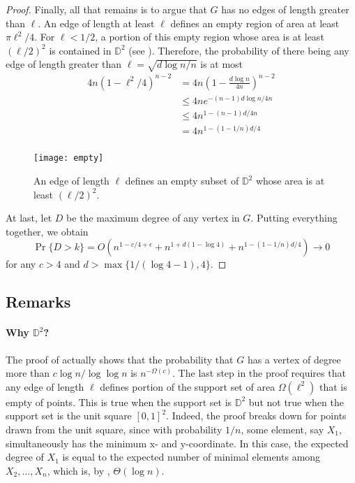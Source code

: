 \documentclass[lotsofwhite,charterfonts]{patmorin}
\newcommand{\D}{\mathbb{D}}
\begin{document}
\begin{proof}
Finally, all that remains is to argue that $G$ has no edges of length
greater than $\ell$.  An edge of length at least $\ell$ defines an empty
region of area at least $\pi\ell^2/4$.  For $\ell < 1/2$, a portion of
this empty region whose area is at least $(\ell/2)^2$ is contained in
$\D^2$ (see ).  Therefore, the probability of there being
any edge of length greater than $\ell=\sqrt{d\log n/n}$ is at most
\[
 \begin{aligned}
   4n(1-\ell^2/4)^{n-2} 
    &  =  4n\left(1-\frac{d\log n}{4n}\right)^{n-2} \\
    & \le 4ne^{-(n-1)d\log n/4n} \\
    & \le 4n^{1-(n-1)d/4n} \\
    & = 4n^{1-(1-1/n)d/4} \\
 \end{aligned}
\]

\begin{figure}
  \begin{center}
    \texttt{[image: empty]}
  \end{center}
  \caption{An edge of length $\ell$ defines an empty subset of $\D^2$ whose
  area is at least $(\ell/2)^2$.}
\end{figure}

At last, let $D$ be the maximum degree of any vertex in $G$.  Putting
everything together, we obtain
\[
   \Pr\{D > k\} = O(n^{1-c/4+\epsilon} 
                      + n^{1+d(1-\log 4)}
                      + n^{1-(1-1/n)d/4} )  \rightarrow 0
\]
for any
$c > 4$ and $d>\max\{1/(\log 4-1),4\}$.
\end{proof}

\subsection{Remarks}

\paragraph{Why $\D^2$?} 
The proof of  actually shows that the
probability that $G$ has a vertex of degree more than $c\log n/\log\log n$
is $n^{-\Omega(c)}$.  The last step in the proof requires that any edge of
length $\ell$ defines portion of the support set of area $\Omega(\ell^2)$
that is empty of points.  This is true when the support set is $\D^2$
but not true when the support set is the unit square $[0,1]^2$.
Indeed, the proof breaks down for points drawn from the unit square,
since with probability $1/n$, some element, say $X_1$, simultaneously
has the minimum $\mathrm x$- and $\mathrm y$-coordinate.  In this case,
the expected degree of $X_1$ is equal to the expected number of minimal
elements among $X_2,\ldots,X_n$, which is, by , $\Theta(\log n)$.
\end{document}
